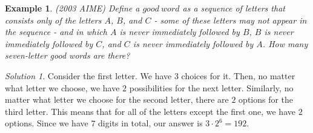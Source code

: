 \documentclass[letterpaper]{article}
\newtheorem{example}[thm]{Example}
\theoremstyle{remark}
\newtheorem*{solution}{Solution}
\theoremstyle{definition}
\begin{document}
\begin{example}
(2003 AIME) Define a $good~word$ as a sequence of letters that consists only of the letters $A$, $B$, and $C$ - some of these letters may not appear in the sequence - and in which $A$ is never immediately followed by $B$, $B$ is never immediately followed by $C$, and $C$ is never immediately followed by $A$. How many seven-letter good words are there?
\end{example}

\begin{solution}
Consider the first letter. We have $3$ choices for it. Then, no matter what letter we choose, we have $2$ possibilities for the next letter. Similarly, no matter what letter we choose for the second letter, there are $2$ options for the third letter. This means that for all of the letters except the first one, we have $2$ options. Since we have $7$ digits in total, our answer is $3\cdot 2^6=192.$
\end{solution}
\end{document}

